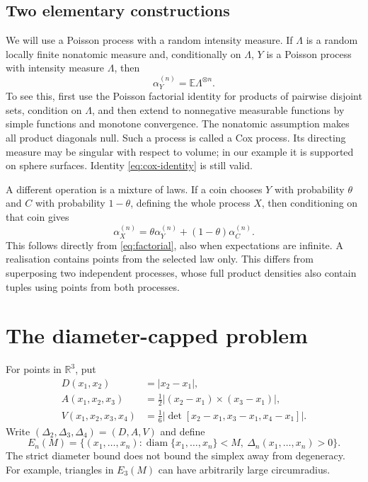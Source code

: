 \documentclass[11pt,a4paper]{article}
\numberwithin{equation}{section}
\theoremstyle{definition}
\theoremstyle{remark}
\newcommand{\R}{\mathbb R}
\newcommand{\E}{\mathbb E}
\newcommand{\diam}{\operatorname{diam}}
\begin{document}
\subsection{Two elementary constructions}
\label{subsec:two-constructions}

We will use a Poisson process with a random intensity measure. If $\Lambda$
is a random locally finite nonatomic measure and, conditionally on
$\Lambda$, $Y$ is a Poisson process with intensity measure $\Lambda$, then
\begin{equation}
 \alpha_Y^{(n)}=\E\Lambda^{\otimes n}.
 \label{eq:cox-identity}
\end{equation}
To see this, first use the Poisson factorial identity for products of
pairwise disjoint sets, condition on $\Lambda$, and then extend to
nonnegative measurable functions by simple functions and monotone
convergence. The nonatomic assumption makes all product diagonals null.
Such a process is called a Cox process. Its directing measure may be
singular with respect to volume; in our example it is supported on sphere
surfaces. Identity \eqref{eq:cox-identity} is still valid.

A different operation is a mixture of laws. If a coin chooses $Y$ with
probability $\theta$ and $C$ with probability $1-\theta$, defining the whole
process $X$, then conditioning on that coin gives
\begin{equation}
 \alpha_X^{(n)}
 =\theta\alpha_Y^{(n)}+(1-\theta)\alpha_C^{(n)}.
 \label{eq:mixture-measure}
\end{equation}
This follows directly from \eqref{eq:factorial}, also when expectations
are infinite. A realisation contains points from the selected law only.
This differs from superposing two independent processes, whose full
product densities also contain tuples using points from both processes.

\section{The diameter-capped problem}
\label{sec:problem}

For points in $\R^3$, put
\begin{align}
 D(x_1,x_2)&=|x_2-x_1|,\nonumber\\
 A(x_1,x_2,x_3)&=\frac12|(x_2-x_1)\times(x_3-x_1)|,\label{eq:simplex}\\
 V(x_1,x_2,x_3,x_4)&=\frac16
 \left|\det[x_2-x_1,x_3-x_1,x_4-x_1]\right|.\nonumber
\end{align}
Write $(\Delta_2,\Delta_3,\Delta_4)=(D,A,V)$ and define
\begin{equation}
 E_n(M)=\{(x_1,\ldots,x_n):\diam\{x_1,\ldots,x_n\}<M,
                       \ \Delta_n(x_1,\ldots,x_n)>0\}.
 \label{eq:domains}
\end{equation}
The strict diameter bound does not bound the simplex away from degeneracy.
For example, triangles in $E_3(M)$ can have arbitrarily large circumradius.
\end{document}
